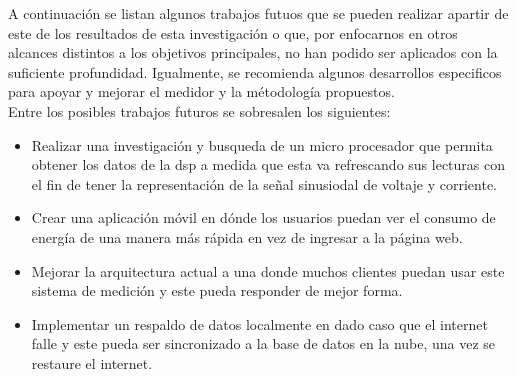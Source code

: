 A continuación se listan algunos trabajos futuos que se pueden realizar apartir de este de los resultados de esta investigación o que, por enfocarnos en otros alcances distintos a los objetivos principales, no han podido ser aplicados con la suficiente profundidad. Igualmente, se recomienda algunos desarrollos especificos para apoyar y mejorar el medidor y la métodología propuestos. \\
Entre los posibles trabajos futuros se sobresalen los siguientes:

\begin{itemize}
    \itemsep0em
    \item Realizar una investigación y busqueda de un micro procesador que permita obtener los datos de la dsp a medida que esta va refrescando sus lecturas con el fin de tener la representación de la señal sinusiodal de voltaje y corriente.
    \item Crear una aplicación móvil en dónde los usuarios puedan ver el consumo de energía de una manera más rápida en vez de ingresar a la página web.
    \item Mejorar la arquitectura actual a una donde muchos clientes puedan usar este sistema de medición y este pueda responder de mejor forma.
    \item Implementar un respaldo de datos localmente en dado caso que el internet falle y este pueda ser sincronizado a la base de datos en la nube, una vez se restaure el internet.
\end{itemize}